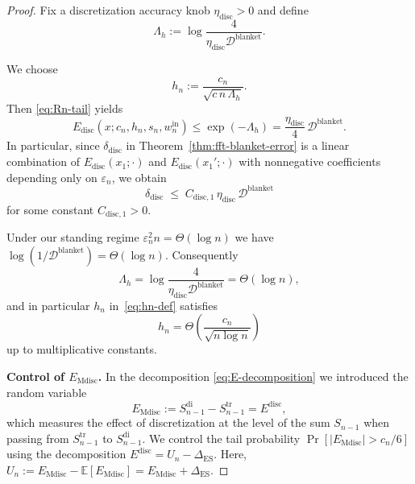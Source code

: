 \documentclass{article}
\theoremstyle{plain}
\theoremstyle{definition}
\begin{document}
\begin{proof}
Fix a discretization accuracy knob $\eta_{\mathrm{disc}}>0$ and define
\[
  \Lambda_h
  :=
  \log\frac{4}{\eta_{\mathrm{disc}} \mathcal{D}^{\mathrm{blanket}}}.
\]


We choose
\begin{equation}
  \label{eq:hn-def}
  h_n
  :=
  \frac{c_n}{\sqrt{c\,n\,\Lambda_h}}.
\end{equation}
Then \eqref{eq:Rn-tail} yields
\[
  E_{\mathrm{disc}}(x;c_n,h_n,s_n,w_n^{\mathrm{in}})
  \le
  \exp(-\Lambda_h)
  =
  \frac{\eta_{\mathrm{disc}}}{4}\,\mathcal{D}^{\mathrm{blanket}}.
\]
In particular, since $\delta_{\mathrm{disc}}$ in
Theorem~\ref{thm:fft-blanket-error} is a linear combination of
$E_{\mathrm{disc}}(x_1;\cdot)$ and $E_{\mathrm{disc}}(x_1';\cdot)$
with nonnegative coefficients depending only on $\varepsilon_n$,
we obtain
\[
  \delta_{\mathrm{disc}}
  \;\le\;
  C_{\mathrm{disc},1}\,
  \eta_{\mathrm{disc}}\,
  \mathcal{D}^{\mathrm{blanket}}
\]
for some constant $C_{\mathrm{disc},1}>0$.


Under our standing regime $\varepsilon_n^2 n = \Theta(\log n)$ we
have $\log(1/\mathcal{D}^{\mathrm{blanket}})=\Theta(\log n)$.
Consequently
\[
  \Lambda_h = \log\frac{4}{\eta_{\mathrm{disc}} \mathcal{D}^{\mathrm{blanket}}}
  = \Theta(\log n),
\]
and in particular $h_n$ in~\eqref{eq:hn-def} satisfies
\[
  h_n
  =
  \Theta\left(\frac{c_n}{\sqrt{n\log n}}\right)
\]
up to multiplicative constants.

\medskip

\textbf{Control of $E_{\mathrm{Mdisc}}$.}
In the decomposition \eqref{eq:E-decomposition} we introduced the
random variable
\[
  E_{\mathrm{Mdisc}}
  :=
  S_{n-1}^{\mathrm{di}} - S_{n-1}^{\mathrm{tr}}
  =
  E^{\mathrm{disc}},
\]
which measures the effect of discretization at the level of the sum
$S_{n-1}$ when passing from $S_{n-1}^{\mathrm{tr}}$ to
$S_{n-1}^{\mathrm{di}}$.
We control the tail probability
$\Pr\left[|E_{\mathrm{Mdisc}}|>c_n/6\right]$ using the decomposition
$E^{\mathrm{disc}} = U_n - \Delta_{\mathrm{ES}}$.
Here, $U_n := E_{\mathrm{Mdisc}} - \mathbb{E}[E_{\mathrm{Mdisc}}] = E_{\mathrm{Mdisc}} + \Delta_{\mathrm{ES}}$.


\end{proof}
\end{document}

